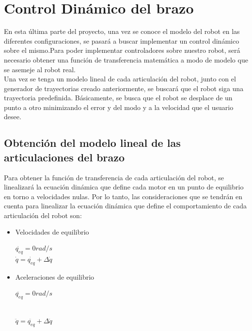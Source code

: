 \section{Control Dinámico del brazo}
En esta última parte del proyecto, una vez se conoce el modelo del robot en las diferentes configuraciones, se pasará a buscar implementar un control dinámico sobre el mismo.Para poder implementar controladores sobre nuestro robot, será necesario obtener una función de transferencia matemática a modo de modelo que se asemeje al robot real.\\

Una vez se tenga un modelo lineal de cada articulación del robot, junto con el generador de trayectorias creado anteriormente, se buscará que el robot siga una trayectoria predefinida. Básicamente, se busca que el robot se desplace de un punto a otro minimizando el error y del modo y a la velocidad que el usuario desee.\\



\subsection{Obtención del modelo lineal de las articulaciones del brazo}

Para obtener la función de transferencia de cada articulación del robot, se linealizará la ecuación dinámica que define cada motor en un punto de equilibrio en torno a velocidades nulas. Por lo tanto, las consideraciones que se tendrán en cuenta para linealizar la ecuación dinámica que define el comportamiento de cada articulación del robot son:

\begin{itemize}

	\item Velocidades de equilibrio

	\begin{center}

		$ \dot{q_{eq}}=0 rad/s $\\

		$ \dot{q} =\dot{q_{eq}}+\Delta\dot{q}$

	\end{center}

	\item Aceleraciones de equilibrio

	\begin{center}

		$ \ddot{q_{eq}}=0 rad/s $\\

		$  $

		$ \ddot{q} =\ddot{q_{eq}}+\Delta\ddot{q}$

	\end{center}

\end{itemize}



